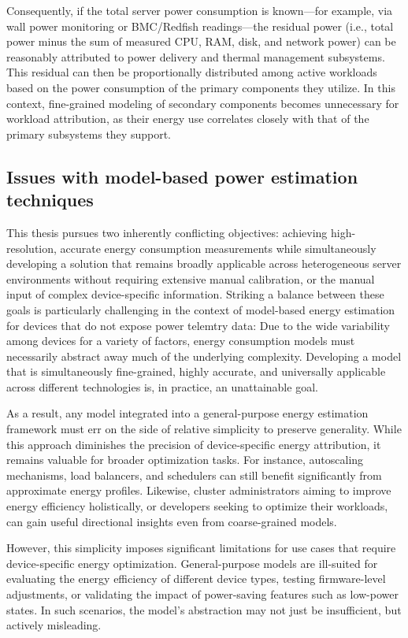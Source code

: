 Consequently, if the total server power consumption is known—for example, via wall power monitoring or BMC/Redfish readings—the residual power (i.e., total power minus the sum of measured CPU, RAM, disk, and network power) can be reasonably attributed to power delivery and thermal management subsystems. This residual can then be proportionally distributed among active workloads based on the power consumption of the primary components they utilize. In this context, fine-grained modeling of secondary components becomes unnecessary for workload attribution, as their energy use correlates closely with that of the primary subsystems they support.

\subsection{Issues with model-based power estimation techniques}
This thesis pursues two inherently conflicting objectives: achieving high-resolution, accurate energy consumption measurements while simultaneously developing a solution that remains broadly applicable across heterogeneous server environments without requiring extensive manual calibration, or the manual input of complex device-specific information. Striking a balance between these goals is particularly challenging in the context of model-based energy estimation for devices that do not expose power telemtry data: Due to the wide variability among devices for a variety of factors, energy consumption models must necessarily abstract away much of the underlying complexity. Developing a model that is simultaneously fine-grained, highly accurate, and universally applicable across different technologies is, in practice, an unattainable goal.

As a result, any model integrated into a general-purpose energy estimation framework must err on the side of relative simplicity to preserve generality. While this approach diminishes the precision of device-specific energy attribution, it remains valuable for broader optimization tasks. For instance, autoscaling mechanisms, load balancers, and schedulers can still benefit significantly from approximate energy profiles. Likewise, cluster administrators aiming to improve energy efficiency holistically, or developers seeking to optimize their workloads, can gain useful directional insights even from coarse-grained models.

However, this simplicity imposes significant limitations for use cases that require device-specific energy optimization. General-purpose models are ill-suited for evaluating the energy efficiency of different device types, testing firmware-level adjustments, or validating the impact of power-saving features such as low-power states. In such scenarios, the model’s abstraction may not just be insufficient, but actively misleading.


